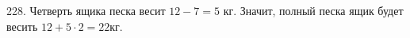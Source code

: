 228. Четверть ящика песка весит $12-7=5$ кг. Значит, полный песка ящик будет весить $12+5\cdot2=22$кг.\\
